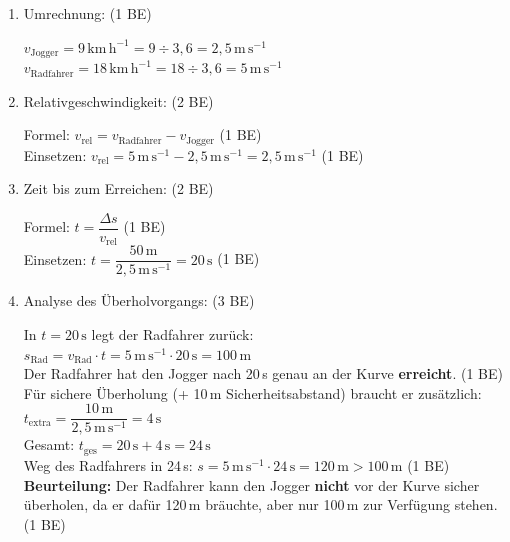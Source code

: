 \documentclass[11pt,a4paper]{article}
\newcommand{\lsg}[1]{\textcolor{correct}{#1}}
\newcommand{\be}[1]{\hfill\textcolor{correct}{\small(#1 BE)}}
\begin{document}
\begin{enumerate}
\item[a)] Umrechnung: \be{1}

\lsg{$v_{\text{Jogger}} = 9\,\mathrm{km\,h^{-1}} = 9 \div 3{,}6 = 2{,}5\,\mathrm{m\,s^{-1}}$}\\
\lsg{$v_{\text{Radfahrer}} = 18\,\mathrm{km\,h^{-1}} = 18 \div 3{,}6 = 5\,\mathrm{m\,s^{-1}}$}

\item[b)] Relativgeschwindigkeit: \be{2}

\lsg{Formel: $v_{\text{rel}} = v_{\text{Radfahrer}} - v_{\text{Jogger}}$} \hfill(1 BE)\\[0.2cm]
\lsg{Einsetzen: $v_{\text{rel}} = 5\,\mathrm{m\,s^{-1}} - 2{,}5\,\mathrm{m\,s^{-1}} = 2{,}5\,\mathrm{m\,s^{-1}}$} \hfill(1 BE)

\item[c)] Zeit bis zum Erreichen: \be{2}

\lsg{Formel: $t = \dfrac{\Delta s}{v_{\text{rel}}}$} \hfill(1 BE)\\[0.2cm]
\lsg{Einsetzen: $t = \dfrac{50\,\mathrm{m}}{2{,}5\,\mathrm{m\,s^{-1}}} = 20\,\mathrm{s}$} \hfill(1 BE)

\item[d)] Analyse des Überholvorgangs: \be{3}

\lsg{In $t = 20\,\mathrm{s}$ legt der Radfahrer zurück:}\\
\lsg{$s_{\text{Rad}} = v_{\text{Rad}} \cdot t = 5\,\mathrm{m\,s^{-1}} \cdot 20\,\mathrm{s} = 100\,\mathrm{m}$}\\[0.2cm]
\lsg{Der Radfahrer hat den Jogger nach 20\,s genau an der Kurve \textbf{erreicht}.} \hfill(1 BE)\\[0.2cm]
\lsg{Für sichere Überholung (+ 10\,m Sicherheitsabstand) braucht er zusätzlich:}\\
\lsg{$t_{\text{extra}} = \dfrac{10\,\mathrm{m}}{2{,}5\,\mathrm{m\,s^{-1}}} = 4\,\mathrm{s}$}\\
\lsg{Gesamt: $t_{\text{ges}} = 20\,\mathrm{s} + 4\,\mathrm{s} = 24\,\mathrm{s}$}\\[0.2cm]
\lsg{Weg des Radfahrers in 24\,s: $s = 5\,\mathrm{m\,s^{-1}} \cdot 24\,\mathrm{s} = 120\,\mathrm{m} > 100\,\mathrm{m}$} \hfill(1 BE)\\[0.2cm]
\lsg{\textbf{Beurteilung:} Der Radfahrer kann den Jogger \textbf{nicht} vor der Kurve sicher überholen, da er dafür 120\,m bräuchte, aber nur 100\,m zur Verfügung stehen.} \hfill(1 BE)
\end{enumerate}
\end{document}
